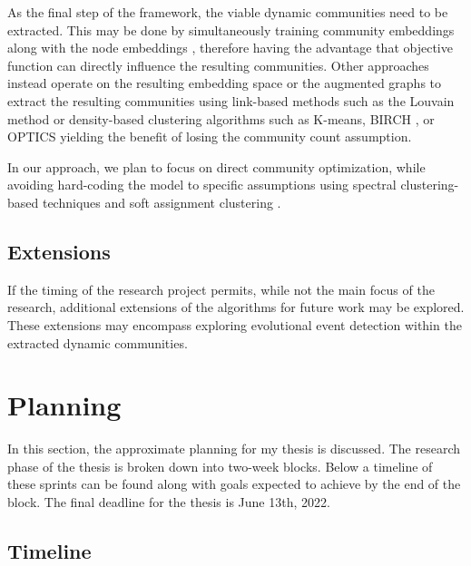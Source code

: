 \documentclass[
acmsmall,
nonacm,
screen,
acmthm]{acmart}
\begin{document}
As the final step of the framework, the viable dynamic communities need
to be extracted. This may be done by simultaneously training community
embeddings along with the node embeddings
\citep{maCommunityawareDynamicNetwork2020, limBlackHoleRobustCommunity2016, wangEvolutionaryAutoencoderDynamic2020},
therefore having the advantage that objective function can directly
influence the resulting communities. Other approaches instead operate on
the resulting embedding space or the augmented graphs to extract the
resulting communities using link-based methods such as the Louvain
method or density-based clustering algorithms such as K-means, BIRCH
\citep{zhangBIRCHEfficientData1996}, or OPTICS
\citep{ankerstOPTICSOrderingPoints1999} yielding the benefit of losing
the community count assumption.

In our approach, we plan to focus on direct community optimization,
while avoiding hard-coding the model to specific assumptions using
spectral clustering-based techniques and soft assignment clustering
\citep[
]{liDivideandconquerBasedLargeScale2021, maCommunityawareDynamicNetwork2020}.

\hypertarget{extensions}{%
\subsection{Extensions}\label{extensions}}

If the timing of the research project permits, while not the main focus
of the research, additional extensions of the algorithms for future work
may be explored. These extensions may encompass exploring evolutional
event detection within the extracted dynamic communities.

\hypertarget{planning}{%
\section{Planning}\label{planning}}

In this section, the approximate planning for my thesis is discussed.
The research phase of the thesis is broken down into two-week blocks.
Below a timeline of these sprints can be found along with goals expected
to achieve by the end of the block. The final deadline for the thesis is
June 13th, 2022.

\hypertarget{timeline}{%
\subsection{Timeline}\label{timeline}}
\end{document}
